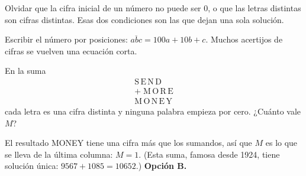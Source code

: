 \begin{trampa}
Olvidar que la cifra inicial de un número no puede ser 0, o que las letras distintas son cifras distintas. Esas dos
condiciones son las que dejan una sola solución.
\end{trampa}

\begin{atajo}
Escribir el número por posiciones: $\overline{abc} = 100a + 10b + c$. Muchos acertijos de cifras se vuelven una ecuación
corta.
\end{atajo}

\begin{reto}
En la suma
\[\begin{array}{r}\mathrm{S\,E\,N\,D}\\+\;\mathrm{M\,O\,R\,E}\\\hline\mathrm{M\,O\,N\,E\,Y}\end{array}\]
cada letra es una cifra distinta y ninguna palabra empieza por cero. ¿Cuánto vale $M$?
\end{reto}

\begin{retoresuelto}
El resultado MONEY tiene una cifra más que los sumandos, así que $M$ es lo que se lleva de la última columna: $M = 1$.
(Esta suma, famosa desde 1924, tiene solución única: $9567 + 1085 = 10652$.) \textbf{Opción B.}
\end{retoresuelto}

